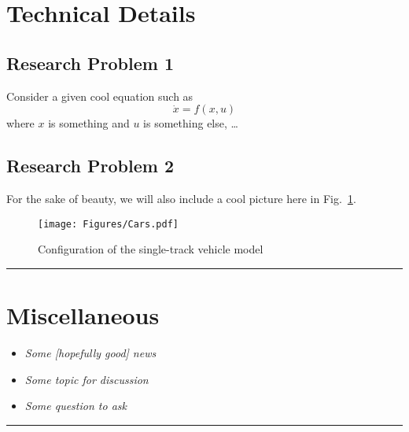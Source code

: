 \documentclass[12pt]{article}
\theoremstyle{definition}
\begin{document}
\section*{Technical Details}\label{tech}

\subsection*{Research Problem 1}\label{tech1}

Consider a given cool equation such as 
\begin{equation}
	\dot{x} = f (x,u)
	\label{eq:coolformula}
\end{equation}
where $x$ is something and $u$ is something else, \dots

\FloatBarrier %

\subsection*{Research Problem 2}\label{tech2}

For the sake of beauty, we will also include a cool picture here in Fig.~\ref{fig:coolfig}. 

	\begin{figure}[htbp]
	\centering
	\texttt{[image: Figures/Cars.pdf]}
	\caption{Configuration of the single-track vehicle model}
	\label{fig:coolfig}
\end{figure}


\FloatBarrier %

\vspace{0.25cm}
\textcolor{ColorDef}{\hrule height 0.5pt}
\vspace{0.25cm}

\section*{Miscellaneous}

\begin{itemize}
\item \emph{Some [hopefully good] news}
\item \emph{Some topic for discussion}
\item \emph{Some question to ask}
\end{itemize}

\vspace{0.25cm}
\textcolor{ColorDef}{\hrule height 0.5pt}
\vspace{0.25cm}


\end{document}
